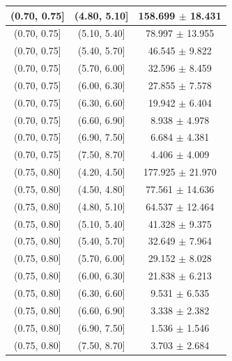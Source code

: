 \begin{longtable}{|c|c|c|}
\hline
(0.70, 0.75] & (4.80, 5.10] & 158.699 $\pm$ 18.431 \\ 
\hline
(0.70, 0.75] & (5.10, 5.40] & 78.997 $\pm$ 13.955 \\ 
\hline
(0.70, 0.75] & (5.40, 5.70] & 46.545 $\pm$ 9.822 \\ 
\hline
(0.70, 0.75] & (5.70, 6.00] & 32.596 $\pm$ 8.459 \\ 
\hline
(0.70, 0.75] & (6.00, 6.30] & 27.855 $\pm$ 7.578 \\ 
\hline
(0.70, 0.75] & (6.30, 6.60] & 19.942 $\pm$ 6.404 \\ 
\hline
(0.70, 0.75] & (6.60, 6.90] & 8.938 $\pm$ 4.978 \\ 
\hline
(0.70, 0.75] & (6.90, 7.50] & 6.684 $\pm$ 4.381 \\ 
\hline
(0.70, 0.75] & (7.50, 8.70] & 4.406 $\pm$ 4.009 \\ 
\hline
(0.75, 0.80] & (4.20, 4.50] & 177.925 $\pm$ 21.970 \\ 
\hline
(0.75, 0.80] & (4.50, 4.80] & 77.561 $\pm$ 14.636 \\ 
\hline
(0.75, 0.80] & (4.80, 5.10] & 64.537 $\pm$ 12.464 \\ 
\hline
(0.75, 0.80] & (5.10, 5.40] & 41.328 $\pm$ 9.375 \\ 
\hline
(0.75, 0.80] & (5.40, 5.70] & 32.649 $\pm$ 7.964 \\ 
\hline
(0.75, 0.80] & (5.70, 6.00] & 29.152 $\pm$ 8.028 \\ 
\hline
(0.75, 0.80] & (6.00, 6.30] & 21.838 $\pm$ 6.213 \\ 
\hline
(0.75, 0.80] & (6.30, 6.60] & 9.531 $\pm$ 6.535 \\ 
\hline
(0.75, 0.80] & (6.60, 6.90] & 3.338 $\pm$ 2.382 \\ 
\hline
(0.75, 0.80] & (6.90, 7.50] & 1.536 $\pm$ 1.546 \\ 
\hline
(0.75, 0.80] & (7.50, 8.70] & 3.703 $\pm$ 2.684 \\ 
\hline
\end{longtable}
